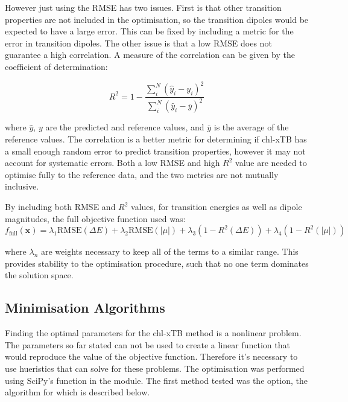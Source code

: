 However just using the RMSE has two issues. First is that other transition properties are not 
included in the optimisation, so the transition dipoles would be expected to have 
a large error. This can be fixed by including a metric for the error in transition dipoles.
The other issue is that a low RMSE does not guarantee a high correlation. A measure
of the correlation can be given by the coefficient of determination:

\begin{equation}
R^2 = 1 - \frac{\sum^N_i \left(\hat{y}_i - y_i \right)^2}{\sum^N_i \left(\hat{y}_i - \bar{y}\right)^2}
\end{equation}

where $\hat{y}$, $y$ are the predicted and reference values, and $\bar{y}$ is the
average of the reference values. The correlation is a better metric for determining
if chl-xTB has a small enough random error to predict transition properties, however
it may not account for systematic errors. Both a low RMSE and high $R^2$ value are
needed to optimise fully to the reference data, and the two metrics are not mutually
inclusive.

By including both RMSE and $R^2$ values, for transition energies as well as dipole
magnitudes, the full objective function used was:
\begin{equation}
f_{\text{full}} \left( \mathbf{x} \right) = \lambda_1 \text{RMSE} \left(\Delta E \right)+ \lambda_2 \text{RMSE}\left( \left| \mu \right| \right) + \lambda_3 \left(1 - R^2 \left( \Delta E \right)\right) + \lambda_4 \left( 1 - R^2 \left( \left| \mu \right| \right)\right)
\end{equation}

where $\lambda_n$ are weights necessary to keep all of the terms to a similar range.
This provides stability to the optimisation procedure, such that no one term dominates
the solution space.

\subsection{Minimisation Algorithms}
\label{subsec:algorithms}
Finding the optimal parameters for the chl-xTB method is a nonlinear problem. The
parameters so far stated can not be used to create a linear function that would
reproduce the value of the objective function. Therefore it's necessary to use
hueristics that can solve for these problems.
The optimisation was performed using SciPy's  function in the 
 module. The first method tested was the  option,
the algorithm for which is described below.

